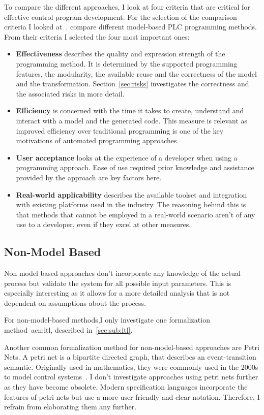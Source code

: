 To compare the different approaches, I look at four criteria that are critical for effective control program development.
For the selection of the comparison criteria I looked at~\cite{VH:2014}.
\citeauthor{VH:2014} compare different model-based PLC programming methods.
From their criteria I selected the four most important ones:
\begin{itemize}
	\item \textbf{Effectiveness} describes the quality and expression strength of the programming method.
	It is determined by the supported programming features, the modularity, the available reuse and the correctness of the model and the transformation.
	Section~\ref{sec:risks} investigates the correctness and the associated risks in more detail.
	\item \textbf{Efficiency} is concerned with the time it takes to create, understand and interact with a model and the generated code.
	This measure is relevant as improved efficiency over traditional programming is one of the key motivations of automated programming approaches.
	\item \textbf{User acceptance} looks at the experience of a developer when using a programming approach.
	Ease of use required prior knowledge and assistance provided by the approach are key factors here.
	\item \textbf{Real-world applicability} describes the available toolset and integration with existing platforms used in the industry.
	The reasoning behind this is that methods that cannot be employed in a real-world scenario aren't of any use to a developer, even if they excel at other measures.
\end{itemize}

\subsection{Non-Model Based}
\label{sec:non_model}

Non model based approaches don't incorporate any knowledge of the actual process but validate the system for all possible input parameters.
This is especially interesting as it allows for a more detailed analysis that is not dependent on assumptions about the process.

For non-model-based methods,I only investigate one formalization method~\acrlong{acn:ltl}, described in~\ref{sec:sub:ltl}.

Another common formalization method for non-model-based approaches are Petri Nets.
A petri net is a bipartite directed graph, that describes an event-transition semantic.
Originally used in mathematics, they were commonly used in the 2000s to model control systems~\cite{Frey:2000:2, Frey:2000aa}.
I don't investigate approaches using petri nets further as they have become obsolete.
Modern specification languages incorporate the features of petri nets but use a more user friendly and clear notation.
Therefore, I refrain from elaborating them any further.

